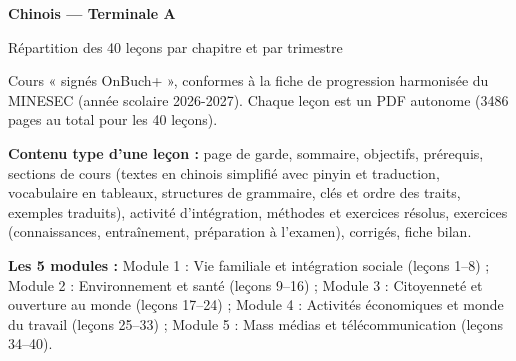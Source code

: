 \documentclass[11pt,a4paper]{article}
\begin{document}
{\LARGE\bfseries Chinois — Terminale A\par}\smallskip
{\large Répartition des 40 leçons par chapitre et par trimestre\par}\medskip
Cours « signés OnBuch+ », conformes à la fiche de progression harmonisée du MINESEC (année scolaire 2026-2027). Chaque leçon est un PDF autonome (3486 pages au total pour les 40 leçons).\par\medskip
\textbf{Contenu type d'une leçon :} page de garde, sommaire, objectifs, prérequis, sections de cours (textes en chinois simplifié avec pinyin et traduction, vocabulaire en tableaux, structures de grammaire, clés et ordre des traits, exemples traduits), activité d'intégration, méthodes et exercices résolus, exercices (connaissances, entraînement, préparation à l'examen), corrigés, fiche bilan.\par\medskip
\textbf{Les 5 modules :} Module 1 : Vie familiale et intégration sociale (leçons 1--8) ; Module 2 : Environnement et santé (leçons 9--16) ; Module 3 : Citoyenneté et ouverture au monde (leçons 17--24) ; Module 4 : Activités économiques et monde du travail (leçons 25--33) ; Module 5 : Mass médias et télécommunication (leçons 34--40).\par\bigskip
\end{document}
